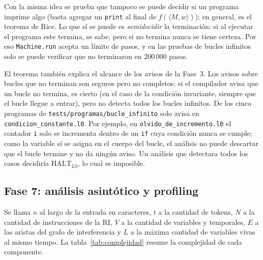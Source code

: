 \documentclass[11pt,a4paper]{article}
\theoremstyle{definition}
\newcommand{\tm}[1]{\texttt{#1}}
\newcommand{\HALT}{\mathrm{HALT}}
\begin{document}
Con la misma idea se prueba que tampoco se puede decidir si un programa
imprime algo (basta agregar un \tm{print} al final de
$f(\langle M, w\rangle)$); en general, es el teorema de Rice. Lo que sí se
puede es \emph{semidecidir} la terminación: si al ejecutar el programa este
termina, se sabe, pero si no termina nunca se tiene certeza. Por eso
\tm{Machine.run} acepta un límite de pasos, y en las pruebas de bucles
infinitos solo se puede verificar que no terminaron en 200\,000 pasos.

El teorema también explica el alcance de los avisos de la Fase~3. Los avisos
sobre bucles que no terminan son seguros pero no completos: si el compilador
avisa que un bucle no termina, es cierto (en el caso de la condición
invariante, siempre que el bucle llegue a entrar), pero no detecta todos los
bucles infinitos. De los cinco programas de \tm{tests/programas/bucle\_infinito}
solo avisa en \tm{condicion\_constante.l0}. Por ejemplo, en
\tm{olvido\_de\_incremento.l0} el contador \tm{i} solo se incrementa dentro
de un \tm{if} cuya condición nunca se cumple; como la variable sí se asigna en
el cuerpo del bucle, el análisis no puede descartar que el bucle termine y no
da ningún aviso. Un análisis que detectara todos los casos decidiría
$\HALT_{L0}$, lo cual es imposible.

\subsection{Fase 7: análisis asintótico y profiling}

Se llama $n$ al largo de la entrada en caracteres, $t$ a la cantidad de
tokens, $N$ a la cantidad de instrucciones de la RI, $V$ a la cantidad de
variables y temporales, $E$ a las aristas del grafo de interferencia y $L$
a la máxima cantidad de variables vivas al mismo tiempo. La
tabla~\ref{tab:complejidad} resume la complejidad de cada componente.
\end{document}
